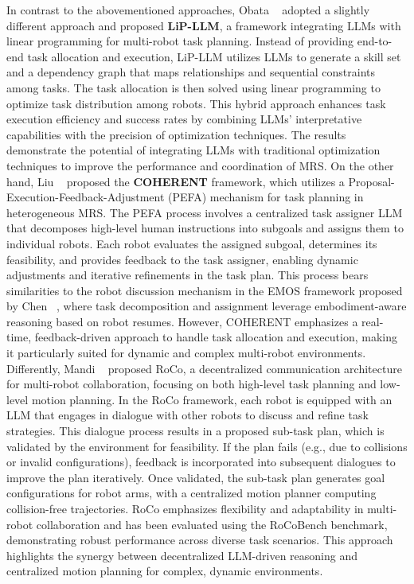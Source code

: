 In contrast to the abovementioned approaches, Obata \etal~\cite{obata_lip-llm_2024} adopted a slightly different approach and proposed \textbf{LiP-LLM}, a framework integrating LLMs with linear programming for multi-robot task planning. Instead of providing end-to-end task allocation and execution, LiP-LLM utilizes LLMs to generate a skill set and a dependency graph that maps relationships and sequential constraints among tasks. The task allocation is then solved using linear programming to optimize task distribution among robots. This hybrid approach enhances task execution efficiency and success rates by combining LLMs' interpretative capabilities with the precision of optimization techniques. The results demonstrate the potential of integrating LLMs with traditional optimization techniques to improve the performance and coordination of MRS.
On the other hand, Liu \etal~\cite{liu_coherent_2024} proposed the \textbf{COHERENT} framework, which utilizes a Proposal-Execution-Feedback-Adjustment (PEFA) mechanism for task planning in heterogeneous MRS. The PEFA process involves a centralized task assigner LLM that decomposes high-level human instructions into subgoals and assigns them to individual robots. Each robot evaluates the assigned subgoal, determines its feasibility, and provides feedback to the task assigner, enabling dynamic adjustments and iterative refinements in the task plan. This process bears similarities to the robot discussion mechanism in the EMOS framework proposed by Chen \etal~\cite{chen_emos_2024}, where task decomposition and assignment leverage embodiment-aware reasoning based on robot resumes. However, COHERENT emphasizes a real-time, feedback-driven approach to handle task allocation and execution, making it particularly suited for dynamic and complex multi-robot environments.
Differently, Mandi \etal~\cite{mandi_roco_2024} proposed RoCo, a decentralized communication architecture for multi-robot collaboration, focusing on both high-level task planning and low-level motion planning. In the RoCo framework, each robot is equipped with an LLM that engages in dialogue with other robots to discuss and refine task strategies. This dialogue process results in a proposed sub-task plan, which is validated by the environment for feasibility. If the plan fails (e.g., due to collisions or invalid configurations), feedback is incorporated into subsequent dialogues to improve the plan iteratively. Once validated, the sub-task plan generates goal configurations for robot arms, with a centralized motion planner computing collision-free trajectories. RoCo emphasizes flexibility and adaptability in multi-robot collaboration and has been evaluated using the RoCoBench benchmark, demonstrating robust performance across diverse task scenarios. This approach highlights the synergy between decentralized LLM-driven reasoning and centralized motion planning for complex, dynamic environments.

